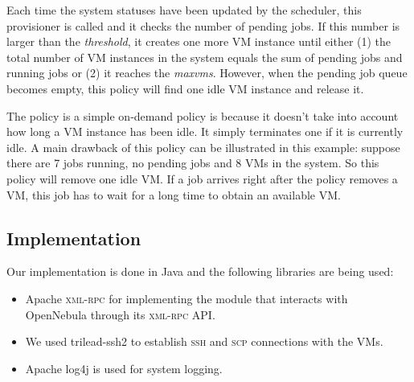 Each time the system statuses have been updated by the scheduler, this
provisioner is called and it checks the number of pending jobs. If
this number is larger than the \emph{threshold}, it creates one more
VM instance until either (1) the total number of VM instances in the
system equals the sum of pending jobs and running jobs or (2) it reaches
the \emph{maxvms}. However, when the pending job queue becomes empty,
this policy will find one idle VM instance and release it.

The \policysimpleelastic{} policy is a simple on-demand policy is because
it doesn't take into account how long a VM instance has been idle. It simply
terminates one if it is currently idle. A main drawback of this policy
can be illustrated in this example: suppose there are 7 jobs running,
no pending jobs and 8 VMs in the system. So this policy will remove
one idle VM. If a job arrives right after the policy removes a VM,
this job has to wait for a long time to obtain an available VM.

\subsection{Implementation}
Our implementation is done in Java and the following libraries are
being used:

\begin{itemize}
\item Apache \textsc{xml-rpc}\cite{URL:ApacheXmlRpc} for implementing the module
  that interacts with OpenNebula through its \textsc{xml-rpc} API.
\item We used trilead-ssh2\cite{URL:trilead-ssh2} to establish
  \textsc{ssh} and \textsc{scp} connections with the VMs.
\item Apache log4j\cite{URL:ApacheLog4j} is used for system logging.
\end{itemize}
